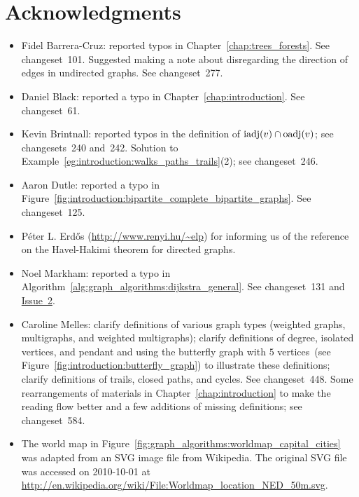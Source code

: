 
\chapter{Acknowledgments}

\begin{itemize}
\item Fidel Barrera-Cruz: reported typos in
  Chapter~\ref{chap:trees_forests}. See changeset~101. Suggested
  making a note about disregarding the direction of edges in
  undirected graphs. See changeset~277.

\item Daniel Black: reported a typo in
  Chapter~\ref{chap:introduction}. See changeset~61.

\item Kevin Brintnall: reported typos in the definition of
  $\operatorname*{iadj}(v) \cap \operatorname*{oadj}(v)$; see changesets~240 and~242. Solution to
  Example~\ref{eg:introduction:walks_paths_trails}(2); see changeset~246.

\item Aaron Dutle: reported a typo in
  Figure~\ref{fig:introduction:bipartite_complete_bipartite_graphs}. See
  changeset~125.

\item P\'eter L. Erd\H{o}s (\url{http://www.renyi.hu/~elp}) for informing
  us of the reference~\cite{ErdosEtAl2010} on the Havel-Hakimi
  theorem for directed graphs.

\item Noel Markham: reported a typo in
  Algorithm~\ref{alg:graph_algorithms:dijkstra_general}. See
  changeset~131 and
  \href{http://code.google.com/p/graph-theory-algorithms-book/issues/detail?id=2}{Issue~2}.

\item Caroline Melles: clarify definitions of various graph types
  (weighted graphs, multigraphs, and weighted multigraphs); clarify
  definitions of degree, isolated vertices, and pendant and using the
  butterfly graph with $5$ vertices~(see
  Figure~\ref{fig:introduction:butterfly_graph}) to
  illustrate these definitions; clarify definitions of trails, closed
  paths, and cycles. See changeset~448. Some rearrangements of
  materials in Chapter~\ref{chap:introduction} to make the reading
  flow better and a few additions of missing definitions; see
  changeset~584.

\item The world map in
  Figure~\ref{fig:graph_algorithms:worldmap_capital_cities} was
  adapted from an SVG image file from Wikipedia. The original SVG file
  was accessed on 2010-10-01 at
  \url{http://en.wikipedia.org/wiki/File:Worldmap_location_NED_50m.svg}.
\end{itemize}
